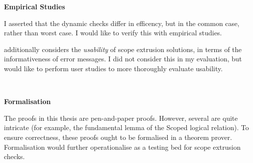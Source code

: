 \noindent\begin{minipage}[t]{0.25\textwidth}
  \textbf{\textsf{Empirical Studies}}
\end{minipage}%
\begin{minipage}[t]{0.75\textwidth}
  I asserted that the dynamic checks differ in efficency, but in the common case, rather than worst case. I would like to verify this with empirical studies.
  \vspace{2mm}

  \citet{kiselyov-14} additionally considers the \textit{usability} of scope extrusion solutions, in terms of the informativeness of error messages. I did not consider this in my evaluation, but would like to perform user studies to more thoroughly evaluate usability.
  \vspace{4mm}
\end{minipage}\\

\noindent\begin{minipage}[t]{0.25\textwidth}
  \textbf{\textsf{Formalisation}}
\end{minipage}%
\begin{minipage}[t]{0.75\textwidth}
  The proofs in this thesis are pen-and-paper proofs. However, several are quite intricate (for example, the fundamental lemma of the \textsf{Scoped} logical relation). To ensure correctness, these proofs ought to be formalised in a theorem prover. Formalisation would further operationalise \sourceLang{} as a testing bed for scope extrusion checks.
\end{minipage}







